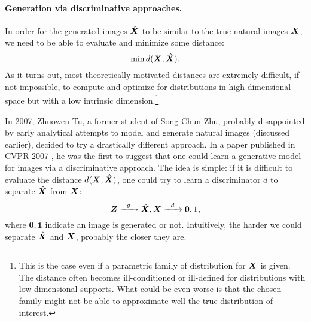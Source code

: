 \documentclass[../../book-main.tex]{subfiles}
\begin{document}
\paragraph{Generation via discriminative approaches.}
In order for the generated images $\hat {\bm{X}}$ to be similar to the true natural images $\bm{X}$, we need to be able to evaluate and minimize some distance:
\begin{equation}
    \min d(\bm{X}, \hat {\bm{X}}).
\end{equation}
As it turns out, most theoretically motivated  distances are extremely difficult, if not impossible, to compute and optimize for distributions in high-dimensional space but with a low intrinsic dimension.\footnote{This is the case even if a parametric family of distribution for $\bm{X}$ is given. The distance often becomes ill-conditioned or ill-defined for distributions with low-dimensional supports. What could be even worse is that the chosen family might not be able to approximate well the true distribution of interest.} 

In 2007, Zhuowen Tu, a former student of Song-Chun Zhu, probably disappointed by early analytical attempts to model and generate natural images (discussed earlier), decided to try a drastically different approach. In a paper published in CVPR 2007 \cite{Tu-2007}, he was the first to suggest that one could learn a generative model for images via a discriminative approach. The idea is simple: if it is difficult to evaluate the distance $d(\bm{X}, \hat {\bm{X}})$, one could try to  learn a discriminator $d$ to separate $\hat {\bm{X}}$ from $\bm{X}$: 
\begin{equation}
    \bm{Z}   \xrightarrow{\hspace{2mm} g  \hspace{2mm}} \hat {\bm{X}}, \bm{X} \xrightarrow{\hspace{2mm} d  \hspace{2mm}} \boldsymbol{0}, \boldsymbol{1},
       \label{eqn:gan-networks}
\end{equation}
where $\boldsymbol{0}, \boldsymbol{1}$ indicate an image is generated or not.
Intuitively, the harder we could separate $\hat {\bm{X}}$ and   $\bm{X}$, probably the closer they are. 
\end{document}
